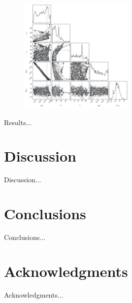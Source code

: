 \documentclass{emulateapj}
\begin{document}
\begin{figure}[H]
\begin{center}
  \includegraphics[width=0.5\textwidth]{parameters.png}
\end{center}
\caption{
    \label{fig:mcmc_triangle}}  
\end{figure}

Results...\\


\section{Discussion}
\label{sec:discussion}

Discussion...\\


\section{Conclusions}
\label{sec:conclusions}

Conclusions...\\


\section*{Acknowledgments}

Acknowledgments...\\





\end{document}
